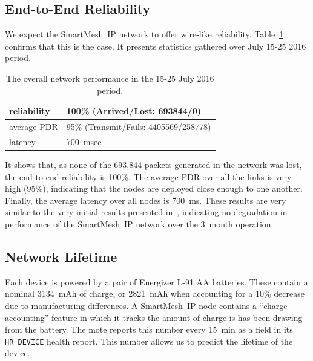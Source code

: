 \documentclass{sig-alternate}
\newcommand{\smip}                {SmartMesh~IP\xspace}
\newcommand{\HRDEVICE}            {{\tt HR\_DEVICE}\xspace}
\begin{document}
\subsection{End-to-End Reliability}
\label{sec:net_reliability}


We expect the \smip network to offer wire-like reliability.
Table~\ref{tab:net_stats} confirms that this is the case.
It presents statistics gathered over July 15-25 2016 period.

\begin{table}
    \begin{tabular}{|l|l|}
        \hline
        reliability & 100\% (Arrived/Lost:   693844/0)\\ \hline
        average PDR & 95\% (Transmit/Fails: 4405569/258778)\\ \hline
        latency     & 700~msec\\
        \hline
    \end{tabular}
    \caption{The overall network performance in the 15-25 July 2016 period.}
    \label{tab:net_stats}
\end{table}

It shows that, as none of the 693,844 packets generated in the network was lost, the end-to-end reliability is 100\%.
The average PDR over all the links is very high (95\%), indicating that the nodes are deployed close enough to one another.
Finally, the average latency over all nodes is 700~ms.
These results are very similar to the very initial results presented in~\cite{watteyne16peach}, indicating no degradation in performance of the \smip network over the 3~month operation.

\subsection{Network Lifetime}
\label{sec:lifetime}


Each device is powered by a pair of Energizer L-91 AA batteries.
These contain a nominal 3134~mAh of charge, or 2821~mAh when accounting for a 10\% decrease due to manufacturing differences.
A \smip node contains a ``charge accounting'' feature in which it tracks the amount of charge is has been drawing from the battery.
The mote reports this number every 15~min as a field in its \HRDEVICE health report.
This number allows us to predict the lifetime of the device.
\end{document}
